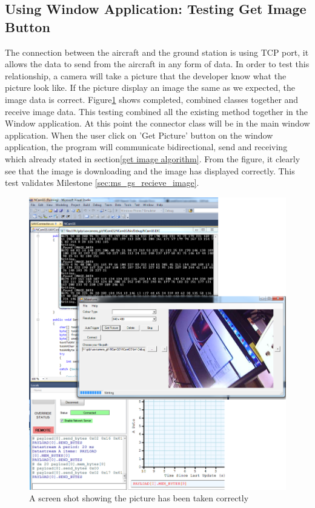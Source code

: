 \subsection{Using Window Application: Testing Get Image Button}
\label{sec:test_get_image_button}
The connection between the aircraft and the ground station is using TCP port, it allows the data to send from the aircraft in any form of data. 
In order to test this relationship, a camera will take a picture that the developer know what the picture look like. 
If the picture display an image the same as we expected, the image data is correct.
Figure\ref{camera testing1} shows completed, combined classes together and receive image data.
This testing combined all the existing method together in the Window application.
At this point the connector class will be in the main window application.
When the user click on 'Get Picture' button on the window application, the program will communicate bidirectional, send and receiving which already stated in section\ref{get image algorithm}. 
From the figure, it clearly see that the image is downloading and the image has displayed correctly. This test validates Milestone \ref{sec:ms_gs_recieve_image}. 
\begin{figure}[H]
\begin{center}
\includegraphics[width=1.00\textwidth]{testing_screenshots/cam_test_11.png} 
\end{center}
\caption{A screen shot showing the picture has been taken correctly\label {camera testing1}}
\end{figure}

